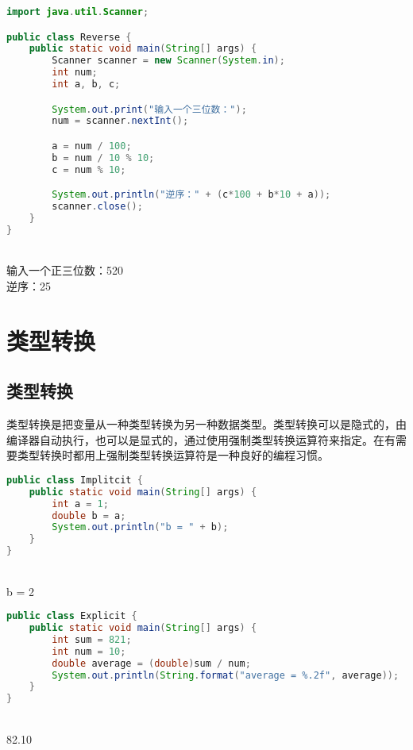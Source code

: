 
\begin{lstlisting}[language=Java]
import java.util.Scanner;

public class Reverse {
	public static void main(String[] args) {
		Scanner scanner = new Scanner(System.in);
		int num;
		int a, b, c;

		System.out.print("输入一个三位数：");
		num = scanner.nextInt();

		a = num / 100;
		b = num / 10 % 10;
		c = num % 10;

		System.out.println("逆序：" + (c*100 + b*10 + a));
		scanner.close();
	}
}
\end{lstlisting}

\begin{tcolorbox}
	 \\
	输入一个正三位数：520 \\
	逆序：25
\end{tcolorbox}

\newpage

\section{类型转换}

\subsection{类型转换}

类型转换是把变量从一种类型转换为另一种数据类型。类型转换可以是隐式的，由编译器自动执行，也可以是显式的，通过使用强制类型转换运算符来指定。在有需要类型转换时都用上强制类型转换运算符是一种良好的编程习惯。 \\

\begin{lstlisting}[language=Java]
public class Implitcit {
	public static void main(String[] args) {
		int a = 1;
		double b = a;
		System.out.println("b = " + b);
	}
}
\end{lstlisting}

\begin{tcolorbox}
	 \\
	b = 2
\end{tcolorbox}

\vspace{0.5cm}


\begin{lstlisting}[language=Java]
public class Explicit {
	public static void main(String[] args) {
		int sum = 821;
		int num = 10;
		double average = (double)sum / num;
		System.out.println(String.format("average = %.2f", average));
	}
}
\end{lstlisting}

\begin{tcolorbox}
	 \\
	82.10
\end{tcolorbox}

\newpage